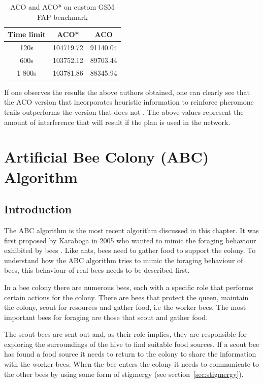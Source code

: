 \begin{table}
\centering
	\begin{tabular}{| c | c | c |}
	\hline
	Time limit & ACO* & ACO \\ \hline
	120s & 104719.72 & 91140.04 \\ \hline
	600s & 103752.12 & 89703.44 \\ \hline
	1 800s & 103781.86 & 88345.94 \\ \hline
	\end{tabular}
\caption{ACO and ACO* on custom GSM FAP benchmark\cite{ACOvsEA}}
\end{table}

If one observes the results the above authors obtained, one can clearly see that the ACO version that incorporates heuristic information to reinforce pheromone trails outperforms the version that does not \cite{ACOvsEA}. The above values represent the amount of interference that will result if the plan is used in the network\cite{ACOvsEA}.
\pagebreak
\section{Artificial Bee Colony (ABC) Algorithm}
\label{sec:BEE}

\subsection{Introduction}
The ABC algorithm is the most recent algorithm discussed in this chapter\cite{ABCCompareStudy,ABCLeafConstrained,ABCNumericalOptimization}. It was first proposed by Karaboga in 2005 who wanted to mimic the foraging behaviour exhibited by bees \cite{ABCCompareStudy,ABCLeafConstrained,ABCNumericalOptimization}. Like ants, bees need to gather food to support the colony. To understand how the ABC algorithm tries to mimic the foraging behaviour of bees, this behaviour of real bees needs to be described first\cite{ABCCompareStudy}. 

In a bee colony there are numerous bees, each with a specific role that performs certain actions for the colony. There are bees that protect the queen, maintain the colony, scout for resources and gather food, i.e the worker bees. The most important bees for foraging are those that scout and gather food\cite{ABCCompareStudy}. 

The scout bees are sent out and, as their role implies, they are responsible for exploring the surroundings of the hive to find suitable food sources\cite{ABCCompareStudy}. If a scout bee has found a food source it needs to return to the colony to share the information with the worker bees\cite{ABCCompareStudy}. When the bee enters the colony it needs to communicate to the other bees by using some form of stigmergy (see section~\ref{sec:stigmergy})\cite{ABCCompareStudy}.

